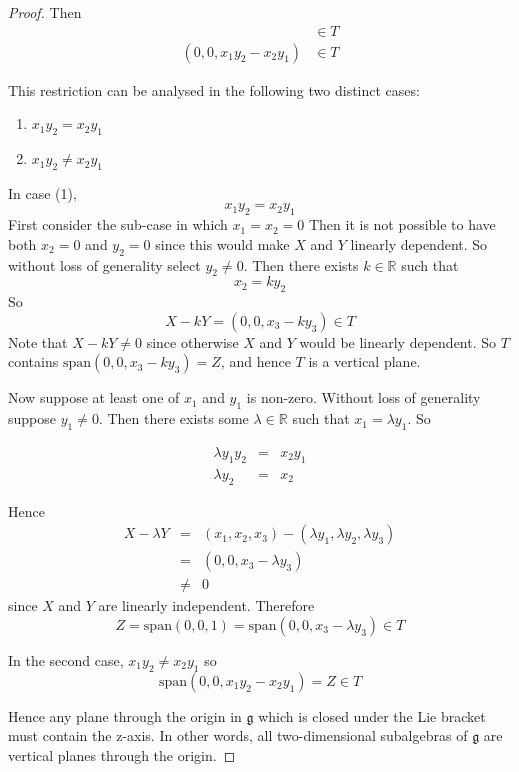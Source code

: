 \documentclass[honours]{UNSWthesis}
\newcommand{\R}{\mathbb{R}}
\newcommand{\g}{\mathfrak{g}}
\newcommand{\1}{\mathbf{e}_{1}}
\newcommand{\2}{\mathbf{e}_{3}}
\newcommand{\3}{\mathbf{e}_{3}}
\begin{document}
\begin{proof}
Then  
\begin{eqnarray*}
  [X,Y] & \in T \\
(0,0, x_{1}y_{2}-x_{2}y_{1}) & \in T
\end{eqnarray*}
   
This restriction can be analysed in the following two distinct cases:

\begin{enumerate}
 \item $x_{1}y_{2}=x_{2}y_{1}$
 \item $x_{1}y_{2}\neq x_{2}y_{1}$
\end{enumerate}

In case (1), 
\[
x_{1}y_{2}=x_{2}y_{1}
\]
First consider the sub-case in which $x_{1}=x_{2}=0$ Then it is not possible to have both $x_{2}=0$ and $y_{2}=0$ since this would make $X$ and $Y$ linearly dependent. So without loss of generality select $y_{2} \neq 0$. Then there exists $k \in \R$ such that 
\[
x_{2} = ky_{2}
\]
So 
\[
X-kY=(0,0,x_{3}-ky_{3}) \in T
\]
Note that $X-kY \neq 0$ since otherwise $X$ and $Y$ would be linearly dependent. So $T$ contains $\text{span}(0,0,x_{3}-ky_{3})=Z$, and hence $T$ is a vertical plane. 

Now suppose at least one of $x_{1}$ and $y_{1}$ is non-zero. Without loss of generality suppose $y_{1} \neq 0$.
Then there exists some $\lambda \in \R$ such that $x_{1} = \lambda y_{1}$. So

\begin{eqnarray*}
 \lambda y_{1}y_{2} &=& x_{2} y_{1}\\
 \lambda y_{2} &=& x_{2}
\end{eqnarray*}

Hence
\begin{eqnarray*}
 X-\lambda Y & = & (x_{1},x_{2},x_{3})-(\lambda y_{1},\lambda y_{2},\lambda y_{3}) \\
	     & = & (0,0,x_{3}-\lambda y_{3}) \\
	     & \neq & 0
\end{eqnarray*}
since $X$ and $Y$ are linearly independent. 
Therefore 
\[
Z=\text{span}(0,0,1)=\text{span}(0,0,x_{3}-\lambda y_{3}) \in T
\]

In the second case, $x_{1}y_{2}\neq x_{2}y_{1}$ so 
\[
\text{span}(0,0, x_{1}y_{2}- x_{2}y_{1})= Z \in T
\]

Hence any plane through the origin in $\g$ which is closed under the Lie bracket must contain the z-axis. In other words, all two-dimensional subalgebras of $\g$ are vertical planes through the origin.



\end{proof}
\end{document}
